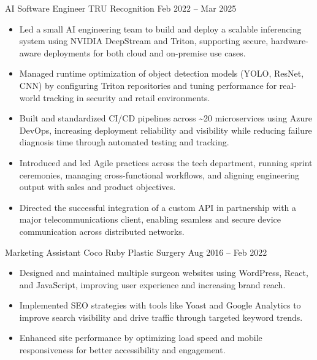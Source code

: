 \documentclass[9pt]{extarticle}
\begin{document}
\cvbreak

\begin{minipage}[t]{\textwidth}
	\vspace{-\baselineskip}

	\cvexperience
		{AI Software Engineer}
		{TRU Recognition}
		{Feb 2022 -- Mar 2025}
		{
			\begin{itemize}[itemsep=0.25em]
				\item Led a small AI engineering team to build and deploy a scalable inferencing system using NVIDIA DeepStream and Triton, supporting secure, hardware-aware deployments for both cloud and on-premise use cases.
				\item Managed runtime optimization of object detection models (YOLO, ResNet, CNN) by configuring Triton repositories and tuning performance for real-world tracking in security and retail environments.
				\item Built and standardized CI/CD pipelines across \textasciitilde20 microservices using Azure DevOps, increasing deployment reliability and visibility while reducing failure diagnosis time through automated testing and tracking.
				\item Introduced and led Agile practices across the tech department, running sprint ceremonies, managing cross-functional workflows, and aligning engineering output with sales and product objectives.
				\item Directed the successful integration of a custom API in partnership with a major telecommunications client, enabling seamless and secure device communication across distributed networks.
			\end{itemize}
		}

	\cvexperience
		{Marketing Assistant}
		{Coco Ruby Plastic Surgery}
		{Aug 2016 -- Feb 2022}
		{
			\begin{itemize}[itemsep=0.25em]
    			\item Designed and maintained multiple surgeon websites using WordPress, React, and JavaScript, improving user experience and increasing brand reach.
				\item Implemented SEO strategies with tools like Yoast and Google Analytics to improve search visibility and drive traffic through targeted keyword trends.
				\item Enhanced site performance by optimizing load speed and mobile responsiveness for better accessibility and engagement.
			\end{itemize}
		}


\end{minipage}
\end{document}
